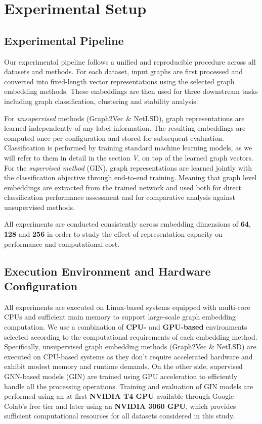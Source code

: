 \section{Experimental Setup}

\subsection{Experimental Pipeline}
Our experimental pipeline follows a unified and reproducible procedure across all datasets and methods.
For each dataset, input graphs are first processed and converted into fixed-length vector representations using the selected
graph embedding methods. 
These embeddings are then used for three downstream tasks including graph classification,
clustering and stability analysis.

For \textit{unsupervised} methods (Graph2Vec \& NetLSD), graph representations are learned independently of any label information. 
The resulting embeddings are computed once per configuration and stored for subsequent evaluation.
Classification is performed by training standard machine learning models, as we will refer to them in detail in the section \textit{V}, 
on top of the learned graph vectors. For the \textit{supervised method} (GIN), graph representations are learned jointly with the classification objective
through end-to-end training. Meaning that graph level embeddings are extracted from the trained network and 
used both for direct classification performance assessment and for comparative analysis against unsupervised methods.

All experiments are conducted consistently across embedding dimensions of \textbf{64}, \textbf{128} and \textbf{256} in order to
study the effect of representation capacity on performance and computational cost.


\subsection{Execution Environment and Hardware Configuration}
All experiments are executed on Linux-based systems equipped with multi-core CPUs and sufficient main memory to support
large-scale graph embedding computation.
We use a combination of \textbf{CPU-} and \textbf{GPU-based} environments selected according to the computational
requirements of each embedding method. Specifically, unsupervised graph embedding methods (Graph2Vec \& NetLSD) 
are executed on CPU-based systems as they don't require
accelerated hardware and exhibit modest memory and runtime demands.
On the other side, supervised GNN-based models (GIN) are trained using GPU acceleration to 
efficiently handle all the processing operations. 
Training and evaluation of GIN models are performed using an at first \textbf{NVIDIA T4 GPU} available through Google Colab's free tier and later using an \textbf{NVIDIA 3060 GPU},
which provides sufficient computational resources for all datasets considered in this study. 


